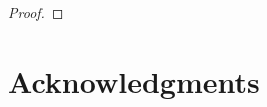 \documentclass[preprint,12pt]{elsarticle}
\begin{document}
\begin{proof}
\end{proof}

\section*{Acknowledgments}




\end{document}
